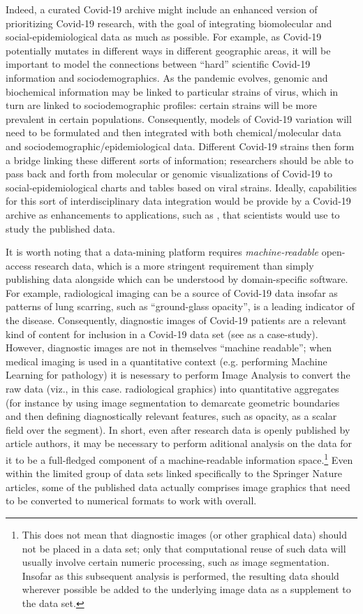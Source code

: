 \documentclass[11pt,letterpaper]{article}
\newcommand{\IQmol}{\resizebox{!}{7pt}{\AcronymText{IQmol}}}
\newcommand{\textscc}[1]{{\color{orr!35!black}{{%
						\fontfamily{Cabin-TLF}\fontseries{b}\selectfont{\textsc{\scriptsize{#1}}}}}}}
\newcommand{\AcronymText}[1]{{\textscc{#1}}}
\newcommand{\Cnineteen}{\resizebox{!}{7pt}{\AcronymText{CORD-19}}}
\newcommand{\p}[1]{

\vspace{.85em}#1}
\newcommand{\q}[1]{{\fontfamily{qcr}\selectfont ``}#1{\fontfamily{qcr}\selectfont ''}}
\begin{document}
\p{Indeed, a curated Covid-19 archive 
might include an enhanced version of \IQmol{} prioritizing 
Covid-19 research, with the goal of integrating biomolecular 
and social-epidemiological data as much as possible.  
For example, as Covid-19 potentially mutates in different 
ways in different geographic areas, it will be important 
to model the connections between \q{hard} scientific 
Covid-19 information and sociodemographics.  
As the pandemic evolves, genomic and biochemical information 
may be linked to particular strains of virus, which 
in turn are linked to sociodemographic profiles: certain 
strains will be more prevalent in certain populations.  
Consequently, models of Covid-19 variation will need to be 
formulated and then integrated with both chemical/molecular 
data and sociodemographic/epidemiological data.  Different 
Covid-19 strains then form a bridge linking these different 
sorts of information; researchers should be able to pass 
back and forth from molecular or genomic visualizations of 
Covid-19 to social-epidemiological charts and tables based 
on viral strains.  Ideally, capabilities for this 
sort of interdisciplinary data integration would be 
provide by a Covid-19 archive as enhancements to applications, 
such as \IQmol{}, that scientists would use to study the 
published data.}

\p{It is worth noting that a data-mining platform requires 
\textit{machine-readable} open-access research data, 
which is a more stringent requirement than simply publishing 
data alongside which can be understood by domain-specific 
software.  For example, radiological imaging can be a source 
of Covid-19 data insofar as patterns of lung 
scarring, such as \q{ground-glass opacity}, is a leading 
indicator of the disease.  Consequently, diagnostic 
images of Covid-19 patients are a relevant kind of 
content for inclusion in a Covid-19 data set 
(see \cite{Shi} as a case-study).  However, 
diagnostic images are not in themselves 
\q{machine readable}; when medical imaging is 
used in a quantitative context (e.g. performing 
Machine Learning for pathology) it is nesessary to 
perform Image Analysis to convert the raw data 
(viz., in this case. radiological graphics) into 
quantitative aggregates (for instance by using image 
segmentation to demarcate geometric boundaries and 
then defining diagnostically relevant features, such 
as opacity, as a scalar field over the segment).  
In short, even after research data is openly published 
by article authors, it may be necessary to perform 
aditional analysis on the data for it to be 
a full-fledged component of a 
machine-readable information space.\footnote{%
This does not mean that diagnostic images (or 
other graphical data) should not be placed in a 
data set; only that computational reuse of such 
data will usually involve certain numeric 
processing, such as image segmentation.  
Insofar as this subsequent analysis is performed, 
the resulting data should wherever possible 
be added to the underlying image data as a 
supplement to the data set.}
Even within the limited group of data sets linked specifically 
to the Springer Nature articles, some of the published 
data actually comprises image graphics that need to be 
converted to numerical formats to work with \Cnineteen{} overall.} 
\end{document}
